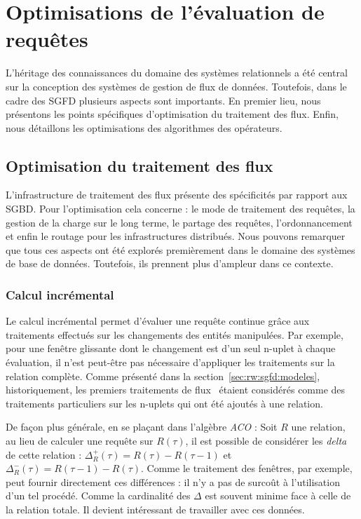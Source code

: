 \section{Optimisations de l'évaluation de requêtes}\label{sec:rw:sgfd:optim}
L'héritage des connaissances du domaine des systèmes relationnels a été central sur la conception des systèmes de gestion de flux de données. Toutefois, dans le cadre des SGFD plusieurs aspects sont importants. En premier lieu, nous présentons les points spécifiques d'optimisation du traitement des flux. Enfin, nous détaillons les optimisations des algorithmes des opérateurs.

\subsection{Optimisation du traitement des flux}\label{sec:rw:sgfd:optimisation:flux}
L'infrastructure de traitement des flux présente des spécificités par rapport aux SGBD. Pour l'optimisation cela concerne : le mode de traitement des requêtes, la gestion de la charge sur le long terme, le partage des requêtes, l'ordonnancement et enfin le routage pour les infrastructures distribués. Nous pouvons remarquer que tous ces aspects ont été explorés premièrement dans le domaine des systèmes de base de données. Toutefois, ils prennent plus d'ampleur dans ce contexte.

\subsubsection{Calcul incrémental}
Le calcul incrémental permet d'évaluer une requête continue grâce aux traitements effectués sur les changements des entités manipulées. Par exemple, pour une fenêtre glissante dont le changement est d'un seul n-uplet à chaque évaluation, il n'est peut-être pas nécessaire d'appliquer les traitements sur la relation complète. Comme présenté dans la section~\ref{sec:rw:sgfd:modeles}, historiquement, les premiers traitements de flux~\cite{Terry:tapestry} étaient considérés comme des traitements particuliers sur les n-uplets qui ont été ajoutés à une relation.

De façon plus générale, en se plaçant dans l'algèbre \textit{ACO} : Soit $R$ une relation, au lieu de calculer une requête sur $R(\tau)$, il est possible de considérer les \textit{delta} de cette relation : $\Delta_R^+(\tau) = R(\tau)-R(\tau-1)$ et $\Delta_R^-(\tau) = R(\tau-1)-R(\tau)$. Comme le traitement des fenêtres, par exemple, peut fournir directement ces différences : il n'y a pas de surcoût à l'utilisation d'un tel procédé. Comme la cardinalité des $\Delta$ est souvent minime face à celle de la relation totale. Il devient intéressant de travailler avec ces données.

